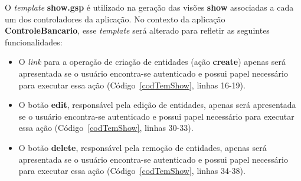 \vspace{0.5cm}

O {\it  template} {\bf show.gsp}  é utilizado na  geração das visões  {\bf show}
associadas a cada  um dos controladores da aplicação.   No contexto da aplicação
{\bf  ControleBancario}, esse  {\it  template} será  alterado  para refletir  as
seguintes funcionalidades:

\vspace{0.3cm}

\begin{itemize}

\item O {\it  link} para a operação de criação de  entidades (ação {\bf create})
  apenas será  apresentada se o  usuário encontra-se autenticado e  possui papel
  necessário para executar essa ação (Código~\ref{codTemShow}, linhas 16-19). 

\vspace{0.3cm}

\item  O botão {\bf  edit}, responsável  pela edição  de entidades,  apenas será
  apresentada  se o usuário  encontra-se autenticado  e possui  papel necessário
  para executar essa ação (Código~\ref{codTemShow}, linhas 30-33).  

\vspace{0.3cm}
 
\item O botão  {\bf delete}, responsável pela remoção  de entidades, apenas será
  apresentada  se o usuário  encontra-se autenticado  e possui  papel necessário
  para executar essa ação (Código~\ref{codTemShow}, linhas 34-38).

\end{itemize}

